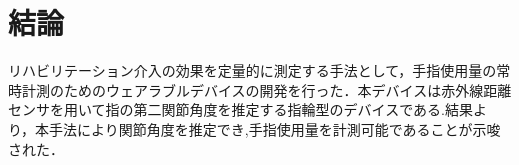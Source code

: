 \chapter{結論}

リハビリテーション介入の効果を定量的に測定する手法として，手指使用量の常時計測のためのウェアラブルデバイスの開発を行った．本デバイスは赤外線距離センサを用いて指の第二関節角度を推定する指輪型のデバイスである.結果より，本手法により関節角度を推定でき,手指使用量を計測可能であることが示唆された．

